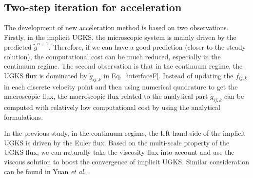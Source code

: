 \documentclass[3p,12pt]{elsarticle}
\begin{document}
	
	\subsection{Two-step iteration for acceleration}
	The development of new acceleration method is based on two observations. Firstly, in the implicit UGKS, the microscopic system is mainly driven by the predicted $\tilde{g}^{n+1}$. Therefore, if we can have a good prediction (closer to the steady solution), the computational cost can be much reduced, especially in the continuum regime.
	The second observation is that in the continuum regime, the UGKS flux is dominated by $\tilde{g}_{ij,k}$ in Eq.~\eqref{interfaceF}. Instead of updating the $f_{ij,k}$ in each discrete velocity point and then using numerical quadrature to get the macroscopic flux, the macroscopic flux related to the analytical part $\tilde{g}_{ij,k}$ can be computed with relatively low computational cost by using the analytical formulations.
	
	In the previous study, in the continuum regime, the left hand side of the implicit UGKS is driven by the Euler flux. Based on the multi-scale property of the UGKS flux, we can naturally take the viscosity flux into account and use the viscous solution to boost the convergence of implicit UGKS. Similar consideration can be found in Yuan \textit{et al.} \cite{yuan2021multi}.
	
\end{document}
